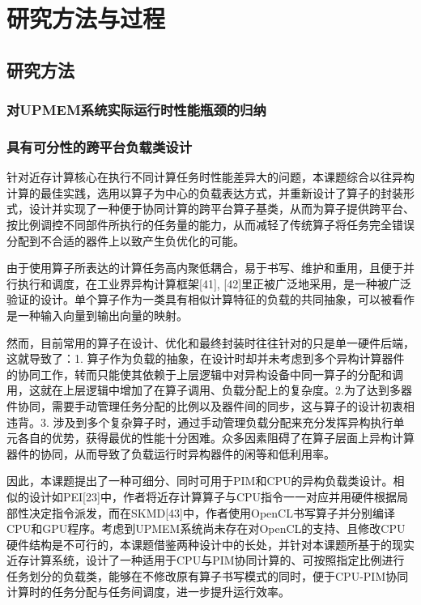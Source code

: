 \chapter{研究方法与过程}\label{chap:Method_And_Research_Procedures} 

\section{研究方法}\label{sec:research_method}
  \subsection{对UPMEM系统实际运行时性能瓶颈的归纳}
  \subsection{具有可分性的跨平台负载类设计}\label{subsec:dividable_load_abstraction_design}
  针对近存计算核心在执行不同计算任务时性能差异大的问题，本课题综合以往异构计算的最佳实践，选用以算子为中心的负载表达方式，并重新设计了算子的封装形式，设计并实现了一种便于协同计算的跨平台算子基类，从而为算子提供跨平台、按比例调控不同部件所执行的任务量的能力，从而减轻了传统算子将任务完全错误分配到不合适的器件上以致产生负优化的可能。

  由于使用算子所表达的计算任务高内聚低耦合，易于书写、维护和重用，且便于并行执行和调度，在工业界异构计算框架[41], [42]里正被广泛地采用，是一种被广泛验证的设计。单个算子作为一类具有相似计算特征的负载的共同抽象，可以被看作是一种输入向量到输出向量的映射。

  然而，目前常用的算子在设计、优化和最终封装时往往针对的只是单一硬件后端，这就导致了：1. 算子作为负载的抽象，在设计时却并未考虑到多个异构计算器件的协同工作，转而只能使其依赖于上层逻辑中对异构设备中同一算子的分配和调用，这就在上层逻辑中增加了在算子调用、负载分配上的复杂度。2.为了达到多器件协同，需要手动管理任务分配的比例以及器件间的同步，这与算子的设计初衷相违背。3. 涉及到多个复杂算子时，通过手动管理负载分配来充分发挥异构执行单元各自的优势，获得最优的性能十分困难。众多因素阻碍了在算子层面上异构计算器件的协同，从而导致了负载运行时异构器件的闲等和低利用率。

  因此，本课题提出了一种可细分、同时可用于PIM和CPU的异构负载类设计。相似的设计如PEI[23]中，作者将近存计算算子与CPU指令一一对应并用硬件根据局部性决定指令派发，而在SKMD[43]中，作者使用OpenCL书写算子并分别编译CPU和GPU程序。考虑到UPMEM系统尚未存在对OpenCL的支持、且修改CPU硬件结构是不可行的，本课题借鉴两种设计中的长处，并针对本课题所基于的现实近存计算系统，设计了一种适用于CPU与PIM协同计算的、可按照指定比例进行任务划分的负载类，能够在不修改原有算子书写模式的同时，便于CPU-PIM协同计算时的任务分配与任务间调度，进一步提升运行效率。

